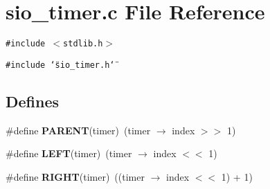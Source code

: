 \section{sio\_\-timer.c File Reference}
\label{sio__timer_8c}
{\tt \#include $<$stdlib.h$>$}\par
{\tt \#include \char`\"{}sio\_\-timer.h\char`\"{}}\par
\subsection*{Defines}
\begin{CompactItemize}
\item 
\#define {\bf PARENT}(timer)\ (timer $\rightarrow$ index  $>$$>$ 1)\label{sio__timer_8c_a0}

\item 
\#define {\bf LEFT}(timer)\ (timer $\rightarrow$ index  $<$$<$ 1)\label{sio__timer_8c_a1}

\item 
\#define {\bf RIGHT}(timer)\ ((timer $\rightarrow$ index $<$$<$ 1) + 1)\label{sio__timer_8c_a2}

\end{CompactItemize}
